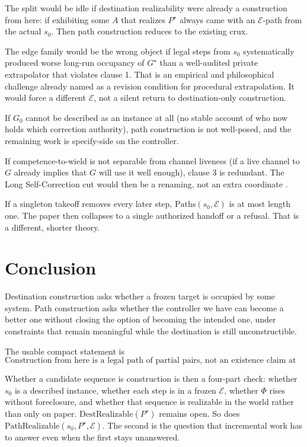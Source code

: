 \documentclass[11pt]{article}
\newcommand{\Eset}{\mathcal{E}}
\begin{document}
The split would be idle if destination realizability were already a construction from here: if exhibiting some \(A\) that realizes \(P^\star\) always came with an \(\Eset\)-path from the actual \(s_0\).
Then path construction reduces to the existing crux.

The edge family would be the wrong object if legal steps from \(s_0\) systematically produced worse long-run occupancy of \(G^\star\) than a well-audited private extrapolator that violates clause 1.
That is an empirical and philosophical challenge already named as a revision condition for procedural extrapolation.
It would force a different \(\Eset\), not a silent return to destination-only construction.

If \(G_0\) cannot be described as an instance at all (no stable account of who now holds which correction authority), path construction is not well-posed, and the remaining work is specify-side on the controller.

If competence-to-wield is not separable from channel liveness (if a live channel to \(G\) already implies that \(G\) will use it well enough), clause 3 is redundant.
The Long Self-Correction cut would then be a renaming, not an extra coordinate \parencite{dai2026longself}.

If a singleton takeoff removes every later step, \(\mathrm{Paths}(s_0,\Eset)\) is at most length one.
The paper then collapses to a single authorized handoff or a refusal.
That is a different, shorter theory.

\section{Conclusion}

Destination construction asks whether a frozen target is occupied by some system.
Path construction asks whether the controller we have can become a better one without closing the option of becoming the intended one, under constraints that remain meaningful while the destination is still unconstructible.

The usable compact statement is
\begin{equation}
    \boxed{\text{Construction from here is a legal path of partial pairs, not an existence claim at the endpoint.}}
\end{equation}

Whether a candidate sequence is construction is then a four-part check: whether \(s_0\) is a described instance, whether each step is in a frozen \(\Eset\), whether \(\Phi\) rises without foreclosure, and whether that sequence is realizable in the world rather than only on paper.
\(\mathrm{DestRealizable}(P^\star)\) remains open.
So does \(\mathrm{PathRealizable}(s_0,P^\star,\Eset)\).
The second is the question that incremental work has to answer even when the first stays unanswered.

\printbibliography
\end{document}
